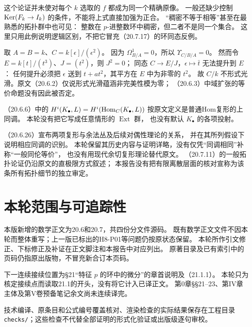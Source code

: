 这个论证并未使对每个 $k$ 选取的 $f$ 都成为同一个精确原像。
一般还缺少控制 $\operatorname{Ker}(F_k\to I_k)$ 的条件，不能将上式直接加强为正合。
“稠密不等于相等”甚至在最熟悉的拓扑群中也可见：
整数在 $p$-进整数环中稠密，但二者不是同一个集合。
这里只用此例说明逻辑区别，不把它冒充（20.7.17）的环同态反例。

取 $A=B=k$、$C=k[\epsilon]/(\epsilon^2)$。
因为 $\Omega^1_{B/A}=0$，所以 $\Upsilon_{C/B/A}=0$。
然而令 $E=k[t]/(t^3)$、$J=(t^2)$，则 $J^2=0$；
同态 $C\to E/J$，$\epsilon\mapsto\bar t$ 无法提升到 $E$：
任何提升必须把 $\epsilon$ 送到 $t+a t^2$，其平方在 $E$ 中为非零的 $t^2$。
故 $C/k$ 不形式光滑。原文（20.6.2）仅说形式光滑蕴涵非完美性模为零；
（20.6.3）中域扩张的等价命题没有因此被否定。

（20.6.6）中的
$H^i(K_\bullet,L)=H^i(\operatorname{Hom}_C(K_\bullet,L))$
按原文定义是普通Hom复形的上同调。
本轮没有把它写成任意情形的 $\operatorname{Ext}$ 群，
也没有默认 $K_\bullet$ 的各项投射。

（20.6.26）宣布两项复形与余法丛及后续对偶性理论的关系，
并在其所列假设下说明相应同调的识别。
本轮保留其历史内容与证明详略，没有仅凭“同调相同”补称“一般同伦等价”，
也没有用现代余切复形理论替代原文。
（20.7.11）的一般拓扑论证仍沿原文的直极限方式叙述；
本报告没有把有限离散层面的核对宣称为该条所有拓扑细节的独立审定。

\section*{本轮范围与可追踪性}
本版新增的数学正文为20.6和20.7，共四份分文件源码。
既有数学正文文件不因本轮而整体重写；上一版已标出的H8-P01等问题仍按原状态保留。
本轮所作引文修正、下标修正及补证在正文脚注和本报告中对应列出。
原著目录及已有索引中的页码仍指原出版物，不冒充新合订本页码。

下一连续接续位置为§21“特征 $p$ 的环中的微分”的章首说明及（21.1.1）。
本轮只为核定接续点而读取21.1的开头，没有将它计入已译正文。
第0章§§21--23、第IV章主体及第V卷预备笔记余文尚未连续译完。

技术编译、原条目和公式编号覆盖核对、渲染检查的实际结果保存在工程目录
\texttt{checks/}；这些检查不代替全部证明的形式化验证或出版级逐句审校。
